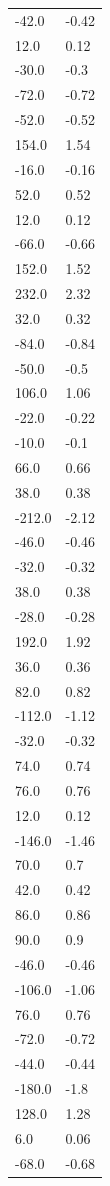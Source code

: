 \begin{longtable}{ll}
-42.0 & -0.42 \\
12.0 & 0.12 \\
-30.0 & -0.3 \\
-72.0 & -0.72 \\
-52.0 & -0.52 \\
154.0 & 1.54 \\
-16.0 & -0.16 \\
52.0 & 0.52 \\
12.0 & 0.12 \\
-66.0 & -0.66 \\
152.0 & 1.52 \\
232.0 & 2.32 \\
32.0 & 0.32 \\
-84.0 & -0.84 \\
-50.0 & -0.5 \\
106.0 & 1.06 \\
-22.0 & -0.22 \\
-10.0 & -0.1 \\
66.0 & 0.66 \\
38.0 & 0.38 \\
-212.0 & -2.12 \\
-46.0 & -0.46 \\
-32.0 & -0.32 \\
38.0 & 0.38 \\
-28.0 & -0.28 \\
192.0 & 1.92 \\
36.0 & 0.36 \\
82.0 & 0.82 \\
-112.0 & -1.12 \\
-32.0 & -0.32 \\
74.0 & 0.74 \\
76.0 & 0.76 \\
12.0 & 0.12 \\
-146.0 & -1.46 \\
70.0 & 0.7 \\
42.0 & 0.42 \\
86.0 & 0.86 \\
90.0 & 0.9 \\
-46.0 & -0.46 \\
-106.0 & -1.06 \\
76.0 & 0.76 \\
-72.0 & -0.72 \\
-44.0 & -0.44 \\
-180.0 & -1.8 \\
128.0 & 1.28 \\
6.0 & 0.06 \\
-68.0 & -0.68 \\

\end{longtable}

